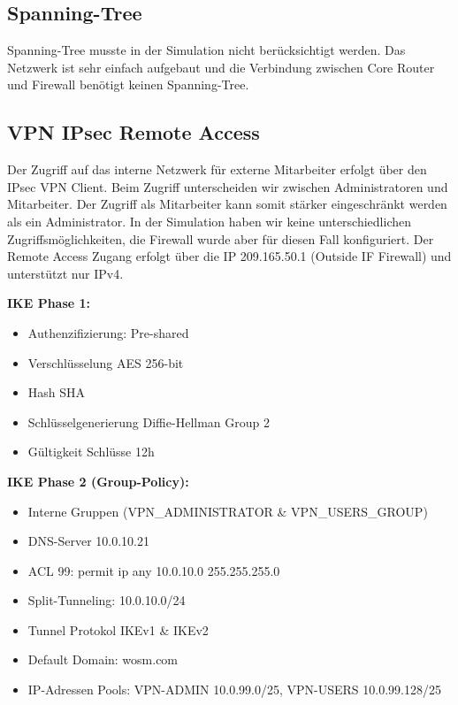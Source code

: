 \documentclass[11pt,a4paper,parskip=half]{scrartcl}
\begin{document}
\subsection{Spanning-Tree}
Spanning-Tree musste in der Simulation nicht berücksichtigt werden. Das Netzwerk ist sehr einfach aufgebaut und die Verbindung zwischen Core Router und Firewall benötigt keinen Spanning-Tree.

\subsection{VPN IPsec Remote Access}
Der Zugriff auf das interne Netzwerk für externe Mitarbeiter erfolgt über den IPsec VPN Client. Beim Zugriff unterscheiden wir zwischen Administratoren und Mitarbeiter. Der Zugriff als Mitarbeiter kann somit stärker eingeschränkt werden als ein Administrator. In der Simulation haben wir keine unterschiedlichen Zugriffsmöglichkeiten, die Firewall wurde aber für diesen Fall konfiguriert. Der Remote Access Zugang erfolgt über die IP 209.165.50.1 (Outside IF Firewall) und unterstützt nur IPv4.

\textbf{IKE Phase 1:}
\begin{itemize}
	\item{Authenzifizierung: Pre-shared}
	\item{Verschlüsselung AES 256-bit}
	\item{Hash SHA}
	\item{Schlüsselgenerierung Diffie-Hellman Group 2}
	\item{Gültigkeit Schlüsse 12h}
\end{itemize}

\textbf{IKE Phase 2 (Group-Policy):}
\begin{itemize}
	\item{Interne Gruppen (VPN\_ADMINISTRATOR \& VPN\_USERS\_GROUP)}
	\item{DNS-Server 10.0.10.21}
	\item{ACL 99: permit ip any 10.0.10.0 255.255.255.0 }
	\item{Split-Tunneling: 10.0.10.0/24}
	\item{Tunnel Protokol IKEv1 \& IKEv2}
	\item{Default Domain: wosm.com}
	\item{IP-Adressen Pools: VPN-ADMIN 10.0.99.0/25, VPN-USERS 10.0.99.128/25}
\end{itemize}
\end{document}

